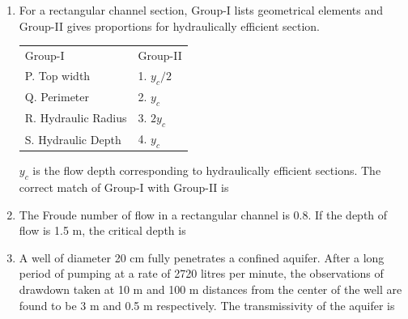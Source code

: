 \documentclass[journal,12pt,onecolumn]{IEEEtran}
\theoremstyle{remark}
\begin{document}
\begin{enumerate}
\noindent\item For a rectangular channel section, {Group-I} lists geometrical elements and {Group-II} gives proportions for hydraulically efficient section. 

\begin{table}[H]
\centering
\begin{tabular}{l l}
Group-I & Group-II  \\
P. Top width     & 1. $y_c/2$ \\
Q. Perimeter    & 2.  $y_c$     \\
R. Hydraulic Radius    & 3.  $2y_c$          \\
S. Hydraulic Depth    & 4. $y_c$
\end{tabular}
\label{table3}
\end{table}
$y_c$ is the flow depth corresponding to hydraulically efficient sections. The correct match of {Group-I} with {Group-II} is
\hfill{}
\begin{enumerate}
\end{enumerate}
\noindent\item The Froude number of flow in a rectangular channel is 0.8. If the depth of flow is 1.5 m, the critical depth is
\hfill{}
\begin{enumerate}
\end{enumerate}
\noindent\item A well of diameter 20 cm fully penetrates a confined aquifer. After a long period of pumping at a rate of 2720 litres per minute, the observations of drawdown taken at 10 m and 100 m distances from the center of the well are found to be 3 m and 0.5 m respectively. The transmissivity of the aquifer is

\end{enumerate}
\end{document}

